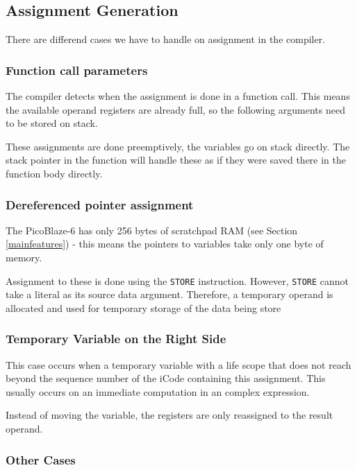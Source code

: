         \subsection{Assignment Generation}

        There are differend cases we have to handle on assignment in the compiler.

            \subsubsection{Function call parameters}

            The compiler detects when the assignment is done in a function call. This means the available operand registers are already full, so the following arguments need to be stored on stack.

            These assignments are done preemptively, the variables go on stack directly. The stack pointer in the function will handle these as if they were saved there in the function body directly.

            \subsubsection{Dereferenced pointer assignment}

            The PicoBlaze-6 has only 256 bytes of scratchpad RAM (see Section \ref{mainfeatures}) - this means the pointers to variables take only one byte of memory.

            Assignment to these is done using the \texttt{STORE} instruction. However, \texttt{STORE} cannot take a literal as its source data argument. Therefore, a temporary operand is allocated and used for temporary storage of the data being store

            \subsubsection{Temporary Variable on the Right Side}

            This case occurs when a temporary variable with a life scope that does not reach beyond the sequence number of the iCode containing this assignment. This usually occurs on an immediate computation in an complex expression.

            Instead of moving the variable, the registers are only reassigned to the result operand.

            \subsubsection{Other Cases}

